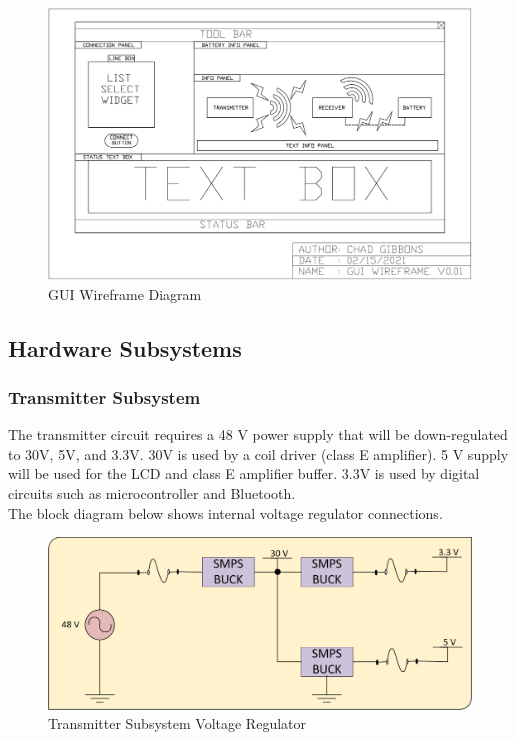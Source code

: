 \documentclass[12pt]{article}
\begin{document}
\hfill

\begin{figure}[h!]
\centering
\includegraphics[width=0.88\linewidth]{gui_wireframe}
\caption{GUI Wireframe Diagram}
\end{figure}

\hfill

\pagebreak

\subsection{Hardware Subsystems}

\subsubsection{Transmitter Subsystem} The transmitter circuit requires a 48 V power supply that will be down-regulated to 30V, 5V, and 3.3V.  30V is used by a coil driver (class E amplifier).  5 V supply will be used for the LCD and class E amplifier buffer.  3.3V is used by digital circuits such as microcontroller and Bluetooth.\\

\indent
The block diagram below shows internal voltage regulator connections.

\hfill

\begin{figure}[h!]
\centering
\includegraphics[width=0.88\linewidth]{trans_sub_volt_reg.png}
\caption{Transmitter Subsystem Voltage Regulator}
\end{figure}
\end{document}
